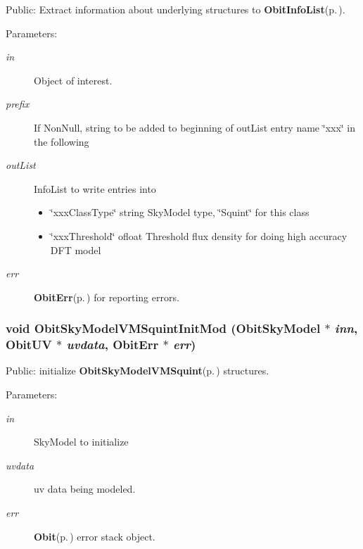 Public: Extract information about underlying structures to {\bf Obit\-Info\-List}{\rm (p.\,\pageref{structObitInfoList})}. 

\begin{Desc}
\item[Parameters:]
\begin{description}
\item[{\em in}]Object of interest. \item[{\em prefix}]If Non\-Null, string to be added to beginning of out\-List entry name \char`\"{}xxx\char`\"{} in the following \item[{\em out\-List}]Info\-List to write entries into \begin{itemize}
\item \char`\"{}xxx\-Class\-Type\char`\"{} string Sky\-Model type, \char`\"{}Squint\char`\"{} for this class \item \char`\"{}xxx\-Threshold\char`\"{} ofloat Threshold flux density for doing high accuracy DFT model \end{itemize}
\item[{\em err}]{\bf Obit\-Err}{\rm (p.\,\pageref{structObitErr})} for reporting errors. \end{description}
\end{Desc}
\subsubsection{\setlength{\rightskip}{0pt plus 5cm}void Obit\-Sky\-Model\-VMSquint\-Init\-Mod ({\bf Obit\-Sky\-Model} $\ast$ {\em inn}, {\bf Obit\-UV} $\ast$ {\em uvdata}, {\bf Obit\-Err} $\ast$ {\em err})}\label{ObitSkyModelVMSquint_8h_a7}


Public: initialize {\bf Obit\-Sky\-Model\-VMSquint}{\rm (p.\,\pageref{structObitSkyModelVMSquint})} structures. 

\begin{Desc}
\item[Parameters:]
\begin{description}
\item[{\em in}]Sky\-Model to initialize \item[{\em uvdata}]uv data being modeled. \item[{\em err}]{\bf Obit}{\rm (p.\,\pageref{structObit})} error stack object. \end{description}
\end{Desc}
